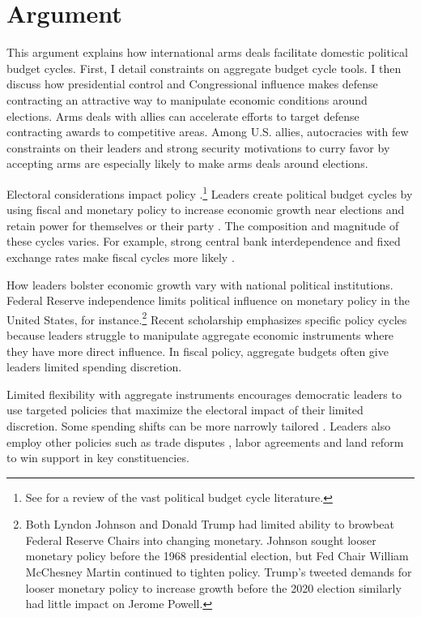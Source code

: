 \documentclass[12pt]{article}
\begin{document}
\section{Argument}


This argument explains how international arms deals facilitate domestic political budget cycles.
First, I detail constraints on aggregate budget cycle tools.
I then discuss how presidential control and Congressional influence makes defense contracting an attractive way to manipulate economic conditions around elections. 
Arms deals with allies can accelerate efforts to target defense contracting awards to competitive areas. 
Among U.S. allies, autocracies with few constraints on their leaders and strong security motivations to curry favor by accepting arms are especially likely to make arms deals around elections.


Electoral considerations impact policy \citep{Nordhaus1975}.\footnote{See \citet{Dubois2016} for a review of the vast political budget cycle literature.} 
Leaders create political budget cycles by using fiscal and monetary policy to increase economic growth near elections and retain power for themselves or their party \citep{Tufte1978, Rogoff1987}. 
The composition and magnitude of these cycles varies. 
For example, strong central bank interdependence and fixed exchange rates make fiscal cycles more likely \citep{ClarkHallerberg2000}. 


How leaders bolster economic growth vary with national political institutions. 
Federal Reserve independence limits political influence on monetary policy in the United States, for instance.\footnote{Both Lyndon Johnson and Donald Trump had limited ability to browbeat Federal Reserve Chairs into changing monetary. 
Johnson sought looser monetary policy before the 1968 presidential election, but Fed Chair William McChesney Martin continued to tighten policy.
Trump's tweeted demands for looser monetary policy to increase growth before the 2020 election similarly had little impact on Jerome Powell.}
Recent scholarship emphasizes specific policy cycles because leaders struggle to manipulate aggregate economic instruments where they have more direct influence. 
In fiscal policy, aggregate budgets often give leaders limited spending discretion.


Limited flexibility with aggregate instruments encourages democratic leaders to use targeted policies that maximize the electoral impact of their limited discretion.
Some spending shifts can be more narrowly tailored \citep[pg. 248]{Dubois2016}.
Leaders also employ other policies such as trade disputes \citep{Conconietal2017}, labor agreements \citep{Ahlquist2010} and land reform \citep{Philips2020} to win support in key constituencies.
\end{document}
